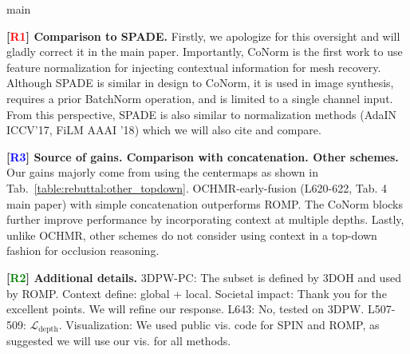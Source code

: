 main\documentclass[10pt,twocolumn,letterpaper]{article}
\newcommand{\Rone}{\textcolor{Red}{R1}}
\newcommand{\Rtwo}{\textcolor{Green}{R2}}
\newcommand{\Rthree}{\textcolor{Blue}{R3}}
\begin{document}
\vspace{1.0mm}\noindent
\textbf{[\Rone] Comparison to SPADE.} Firstly, we apologize for this oversight and will gladly correct it in the main paper. Importantly, CoNorm is the first work to use feature normalization for injecting contextual information for mesh recovery. Although SPADE is similar in design to CoNorm, it is used in image synthesis, requires a prior BatchNorm operation, and is limited to a single channel input. From this perspective, SPADE is also similar to normalization methods (\eg AdaIN {\scriptsize ICCV'17}, FiLM {\scriptsize AAAI '18}) which we will also cite and compare.

\vspace{1.0mm}\noindent
\textbf{[\Rthree] Source of gains. Comparison with concatenation. Other schemes.} Our gains majorly come from using the centermaps as shown in Tab.~\ref{table:rebuttal:other_topdown}. OCHMR-early-fusion (L620-622, Tab. 4 main paper) with simple concatenation outperforms ROMP. The CoNorm blocks further improve performance by incorporating context at multiple depths. Lastly, unlike OCHMR, other schemes do not consider using context in a top-down fashion for occlusion reasoning.


\vspace{1.0mm}\noindent
\textbf{[\Rtwo] Additional details.} 3DPW-PC: The subset is defined by 3DOH and used by ROMP. Context define: global + local. Societal impact: Thank you for the excellent points. We will refine our response. L643: No, tested on 3DPW. L507-509: $\mathcal{L}_{\text{depth}}$. Visualization: We used public vis. code for SPIN and ROMP, as suggested we will use our vis. for all methods. 
\end{document}
